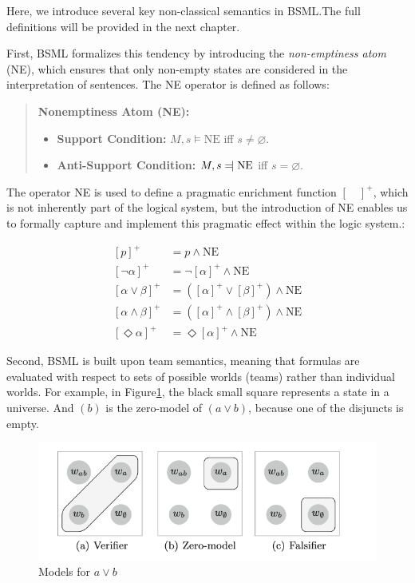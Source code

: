 Here, we introduce several key non-classical semantics in BSML.\@ The full definitions will be provided in the next chapter.\@


First, BSML formalizes this tendency by introducing the \textit{non-emptiness atom} (NE), which ensures that only non-empty states are considered in the interpretation of sentences. 
The NE operator is defined as follows:  

\begin{quote}
    \textbf{Nonemptiness Atom (NE):} 
    \begin{itemize}
        \item \textbf{Support Condition:} $M, s \models \text{NE}$ iff $s \neq \varnothing$.
        \item \textbf{Anti-Support Condition:} $M, s \leftmodels \text{NE}$ iff $s = \varnothing$.
    \end{itemize}
\end{quote}


    The operator NE is used to define a pragmatic enrichment function \({[ \quad]}^+\), which is not inherently part of the logical system, 
    but the introduction of NE enables us to formally capture and implement this pragmatic effect within the logic system.:


\begin{align*}
    {[p]}^+ &= p \land \text{NE} \\
    {[\neg \alpha]}^+ &= \neg {[\alpha]}^+ \land \text{NE} \\
    {[\alpha \lor \beta]}^+ &= ({[\alpha]}^+ \lor {[\beta]}^+) \land \text{NE} \\
    {[\alpha \land \beta]}^+ &= ({[\alpha]}^+ \land {[\beta]}^+) \land \text{NE} \\
    {[\Diamond \alpha]}^+ &= \Diamond {[\alpha]}^+ \land \text{NE}
\end{align*}

Second, BSML is built upon team semantics, meaning that formulas are evaluated with respect to sets of possible worlds (teams) rather than individual worlds. 
For example, in Figure\ref{disjunct}, the black small square represents a state in a universe.
And \( (b) \) is the zero-model of \( ( a \vee b ) \), because one of the disjuncts is empty.

\begin{figure}[h]
    \centering
    \includegraphics[width=\textwidth]{image/disj1.png}
    \caption{Models for \( a \vee b \)}\label{disjunct}
\end{figure}

